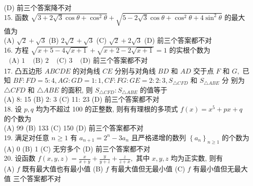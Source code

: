 (D) 前三个答案降不对\\
15. 函数 $\sqrt{3+2 \sqrt{3} \cos \theta+\cos ^{2} \theta}+\sqrt{5-2 \sqrt{3} \cos \theta+\cos ^{2} \theta+4 \sin ^{2} \theta}$ 的最大值为\\
(A) $\sqrt{2}+\sqrt{3}$
(B) $2 \sqrt{2}+\sqrt{3}$
(C) $\sqrt{2}+2 \sqrt{3}$
(D) 前三个答案都不对\\
16. 方程 $\sqrt{x+5-4 \sqrt{x+1}}+\sqrt{x+2-2 \sqrt{x+1}}=1$ 的实根个数为\\
$\begin{array}{lll}\text { (A) } 1 & \text { (B) } 2 & \text { (C) } 3 & \text { (D) 前三个答案都不对 }\end{array}$\\
17. 凸五边形 $A B C D E$ 的对角线 $C E$ 分别与对角线 $B D$ 和 $A D$ 交于点 $F$ 和 $G,$ 已知 $B F: F D=5: 4, A G: G D=1: 1, C F: F G: G E=2: 2: 3, S_{\triangle C F D}$ 和 $S_{\triangle A B E}$ 分
别为 $\triangle C F D$ 和 $\triangle A B E$ 的面积, 则 $S_{\triangle C F D}: S_{\triangle A B E}$ 的值等于\\
(A) 8: 15
(B) 2: 3
(C) 11: 23
(D) 前三个答案都不对\\
18. 设 $p, q$ 均为不超过 100 的正整数, 则有有理根的多项式 $f(x)=x^{5}+p x+q$ 的个数为\\
(A) 99
(B) 133
(C) 150
(D) 前三个答案都不对\\
19. 满足对任意 $n \geq 1$ 有 $a_{n+1}=2^{n}-3 a_{n}$ 且严格递增的数列 $\left\{a_{n}\right\}_{n \geq 1}$ 的个数为\\
(A) 0
(B) 1
(C) 无穷多个
(D) 前三个答案都不对\\
20. 设函数 $f(x, y, z)=\frac{x}{x+y}+\frac{y}{y+z}+\frac{z}{z+x},$ 其中 $x, y, z$ 均为正实数, 则有\\
(A) $f$ 既有最大值也有最小值
(B) $f$ 有最大值但无最小值
(C) $f$ 有最小值但无最大值
三个答案都不对

